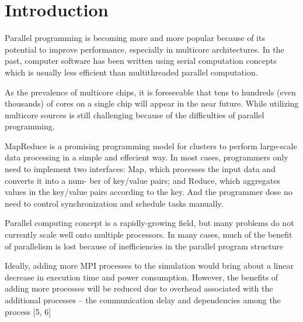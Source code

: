 \section{Introduction}
\label{sec:intro}





Parallel programming is becoming more and more popular
because of its potential to improve performance, especially in
multicore architectures. In the past, computer software has
been written using serial computation concepts which is
usually less efficient than multithreaded parallel computation.


As the prevalence of multicore chips,
it is foreseeable
that tens to hundreds (even thousands) of cores on a single chip
will appear in the near future\cite{Borkar2007core}.
While utilizing multicore sources is still challenging
because of the difficulties of parallel programming.

MapReduce\cite{dean2004mapreduce} 
is a promising programming model for clusters
to perform large-scale data processing
in a simple and effecient way.
In most cases, programmers only need to implement two interfaces:
Map, which processes the input data and converts it into a num-
ber of key/value pairs; and Reduce, which aggregates values in the
key/value pairs according to the key.
And the programmer dose no need to control synchronization 
and schedule tasks manually.

Parallel computing concept is a rapidly-growing field,
but many problems do not currently scale well onto multiple
processors. In many cases, much of the benefit of parallelism is
lost because of inefficiencies in the parallel program structure


Ideally, adding more MPI processes to the simulation
would bring about a linear decrease in execution time and
power consumption.
However, the benefits of adding more
processes will be reduced due to overhead associated with the
additional processes – the communication delay and
 dependencies among the process [5, 6]

